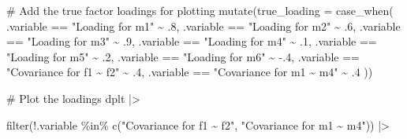 \documentclass[
  letterpaper,
  DIV=11,
  numbers=noendperiod]{scrreprt}
\newenvironment{Shaded}{\begin{snugshade}}{\end{snugshade}}
\newcommand{\AttributeTok}[1]{\textcolor[rgb]{0.40,0.45,0.13}{#1}}
\newcommand{\CommentTok}[1]{\textcolor[rgb]{0.37,0.37,0.37}{#1}}
\newcommand{\DecValTok}[1]{\textcolor[rgb]{0.68,0.00,0.00}{#1}}
\newcommand{\FunctionTok}[1]{\textcolor[rgb]{0.28,0.35,0.67}{#1}}
\newcommand{\NormalTok}[1]{\textcolor[rgb]{0.00,0.23,0.31}{#1}}
\newcommand{\SpecialCharTok}[1]{\textcolor[rgb]{0.37,0.37,0.37}{#1}}
\newcommand{\StringTok}[1]{\textcolor[rgb]{0.13,0.47,0.30}{#1}}
\begin{document}
\begin{Shaded}
\begin{Highlighting}[]
  \CommentTok{\# Add the true factor loadings for plotting}
  \FunctionTok{mutate}\NormalTok{(}\AttributeTok{true\_loading =} \FunctionTok{case\_when}\NormalTok{(}
\NormalTok{    .variable }\SpecialCharTok{==} \StringTok{"Loading for m1"} \SpecialCharTok{\textasciitilde{}}\NormalTok{ .}\DecValTok{8}\NormalTok{,}
\NormalTok{    .variable }\SpecialCharTok{==} \StringTok{"Loading for m2"} \SpecialCharTok{\textasciitilde{}}\NormalTok{ .}\DecValTok{6}\NormalTok{,}
\NormalTok{    .variable }\SpecialCharTok{==} \StringTok{"Loading for m3"} \SpecialCharTok{\textasciitilde{}}\NormalTok{ .}\DecValTok{9}\NormalTok{,}
\NormalTok{    .variable }\SpecialCharTok{==} \StringTok{"Loading for m4"} \SpecialCharTok{\textasciitilde{}}\NormalTok{ .}\DecValTok{1}\NormalTok{,}
\NormalTok{    .variable }\SpecialCharTok{==} \StringTok{"Loading for m5"} \SpecialCharTok{\textasciitilde{}}\NormalTok{ .}\DecValTok{2}\NormalTok{,}
\NormalTok{    .variable }\SpecialCharTok{==} \StringTok{"Loading for m6"} \SpecialCharTok{\textasciitilde{}} \SpecialCharTok{{-}}\NormalTok{.}\DecValTok{4}\NormalTok{,}
\NormalTok{    .variable }\SpecialCharTok{==} \StringTok{"Covariance for f1 \textasciitilde{} f2"} \SpecialCharTok{\textasciitilde{}}\NormalTok{ .}\DecValTok{4}\NormalTok{,}
\NormalTok{    .variable }\SpecialCharTok{==} \StringTok{"Covariance for m1 \textasciitilde{} m4"} \SpecialCharTok{\textasciitilde{}}\NormalTok{ .}\DecValTok{4}
\NormalTok{  )) }

\CommentTok{\# Plot the loadings}
\NormalTok{dplt }\SpecialCharTok{|\textgreater{}}

  \FunctionTok{filter}\NormalTok{(}\SpecialCharTok{!}\NormalTok{.variable }\SpecialCharTok{\%in\%} \FunctionTok{c}\NormalTok{(}\StringTok{"Covariance for f1 \textasciitilde{} f2"}\NormalTok{, }\StringTok{"Covariance for m1 \textasciitilde{} m4"}\NormalTok{)) }\SpecialCharTok{|\textgreater{}}


\end{Highlighting}
\end{Shaded}
\end{document}
